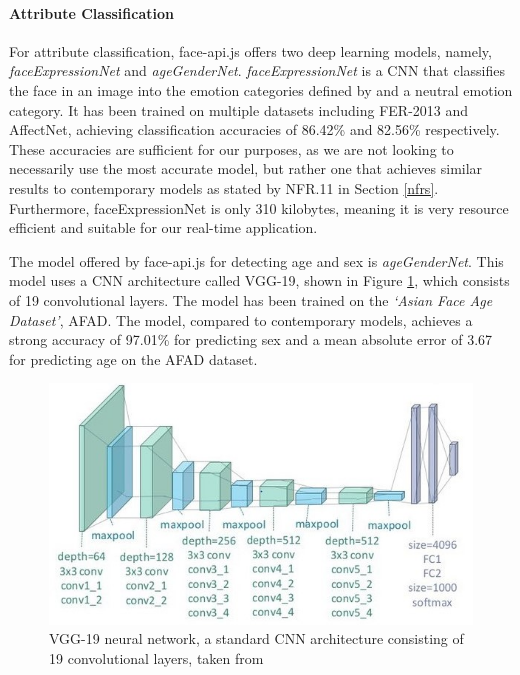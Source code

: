\documentclass[12pt, a4paper]{article}
\newcommand{\np}
    {
    \vskip 0.4cm
    }
\begin{document}
\paragraph{Attribute Classification}

For attribute classification, face-api.js offers two deep learning models, namely, \textit{faceExpressionNet} and \textit{ageGenderNet}. \textit{faceExpressionNet} is a CNN that classifies the face in an image into the emotion categories defined by \cite{ekman} and a neutral emotion category. It has been trained on multiple datasets including FER-2013 and AffectNet, achieving classification accuracies of 86.42\% and 82.56\% respectively. These accuracies are sufficient for our purposes, as we are not looking to necessarily use the most accurate model, but rather one that achieves similar results to contemporary models as stated by NFR.11 in Section \ref{nfrs}. Furthermore, faceExpressionNet is only 310 kilobytes, meaning it is very resource efficient and suitable for our real-time application. 
\np
The model offered by face-api.js for detecting age and sex is \textit{ageGenderNet}. This model uses a CNN architecture called VGG-19, shown in Figure \ref{fig:vgg}, which consists of 19 convolutional layers. The model has been trained on the \textit{`Asian Face Age Dataset'}, AFAD. The model, compared to contemporary models, achieves a strong accuracy of 97.01\% for predicting sex and a mean absolute error of 3.67 for predicting age on the AFAD dataset. 
\np
\begin{figure}[H]
    \centering
    \includegraphics[scale=0.72]{images/vgg.jpg}
    \caption{VGG-19 neural network, a standard CNN architecture consisting of 19 convolutional layers, taken from \cite{vgg}}
    \label{fig:vgg}
\end{figure}
\end{document}
